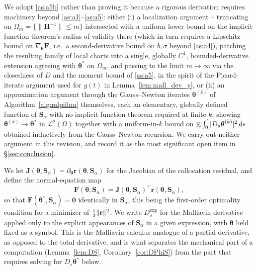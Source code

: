 \documentclass[11pt, a4paper]{article}
\theoremstyle{theoremstyle}
\theoremstyle{definitionstyle}
\newcommand{\dd}{\mathop{}\!d}
\DeclareMathOperator{\EE}{\mathbb E}
\DeclarePairedDelimiter{\norm}{\lVert}{\rVert}
\DeclarePairedDelimiter{\abs}{\lvert}{\rvert}
\begin{document}
We adopt \ref{as:a5b} rather than proving it because a rigorous derivation requires machinery beyond \ref{as:a1}--\ref{as:a5}: either (i) a localization argument -- truncating on $\Omega_m = \{\|\mathbf H^{-1}\|\le m\}$ intersected with a uniform lower bound on the implicit function theorem's radius of validity there (which in turn requires a Lipschitz bound on $\nabla_{\boldsymbol\theta}\mathbf F$, i.e.\ a second-derivative bound on $b,\sigma$ beyond \ref{as:a4}), patching the resulting family of local charts into a single, globally $C^1$, bounded-derivative extension agreeing with $\boldsymbol\theta^*$ on $\Omega_m$, and passing to the limit $m\to\infty$ via the closedness of $D$ and the moment bound of \ref{as:a5}, in the spirit of the Picard-iterate argument used for $y(t)$ in Lemma~\ref{lem:mall_dev_y}, or (ii) an approximation argument through the Gauss--Newton iterates $\boldsymbol\theta^{(k)}$ of Algorithm~\ref{alg:mlpiflnn} themselves, each an elementary, globally defined function of $\mathbf S_\alpha$ with no implicit function theorem required at finite $k$, showing $\boldsymbol\theta^{(k)}\to\boldsymbol\theta^*$ in $\mathcal L^2(\Omega)$ together with a uniform-in-$k$ bound on $\EE\int_0^1\abs{D_s\boldsymbol\theta^{(k)}}^2\dd{s}$ obtained inductively from the Gauss--Newton recursion. We carry out neither argument in this revision, and record it as the most significant open item in \S\ref{sec:conclusion}.

We let $\mathbf J( \boldsymbol \theta,\mathbf S_\alpha ) = \partial_{\boldsymbol \theta} \mathbf r(\boldsymbol \theta, \mathbf S_\alpha)$ for the Jacobian of the collocation residual, and define the normal-equation map
\begin{equation}
    \mathbf F(\boldsymbol\theta,\mathbf S_\alpha)=\mathbf J(\boldsymbol\theta,\mathbf S_\alpha)^\top\mathbf r(\boldsymbol\theta,\mathbf S_\alpha),
\end{equation}
so that $\mathbf F(\boldsymbol\theta^*,\mathbf S_\alpha)=\mathbf 0$ identically in $\mathbf S_\alpha$, this being the first-order optimality condition for a minimizer of $\frac12\norm{\mathbf r}^2$. We write $D_s^{\exp}$ for the Malliavin derivative applied only to the explicit appearances of $\mathbf S_\alpha$ in a given expression, with $\boldsymbol \theta$ held fixed as a symbol. This is the Malliavin-calculus analogue of a partial derivative, as opposed to the total derivative, and is what separates the mechanical part of a computation (Lemma~\ref{lem:DS}, Corollary~\ref{cor:DPhiS}) from the part that requires solving for $D_s \boldsymbol \theta^*$ below.
\end{document}

